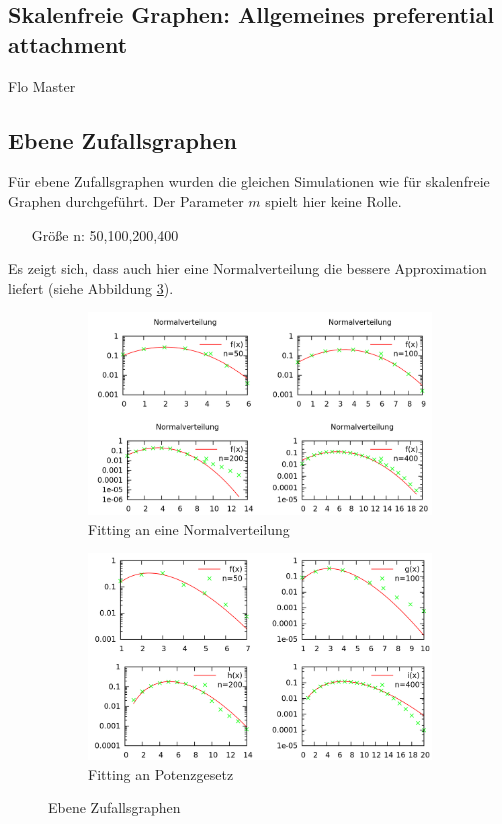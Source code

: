\documentclass[10pt]{article}
\begin{document}
\subsection{Skalenfreie Graphen: Allgemeines preferential attachment}
Flo Master

\subsection{Ebene Zufallsgraphen}
Für ebene Zufallsgraphen wurden die gleichen Simulationen wie für skalenfreie Graphen durchgeführt. Der Parameter $m$ spielt hier keine Rolle.
\begin{itemize}
\item[\quad Größe n:] 50,100,200,400
\end{itemize}
Es zeigt sich, dass auch hier eine Normalverteilung die bessere Approximation liefert (siehe Abbildung \ref{fig:planar}).

\begin{figure}[htb!]
\begin{subfigure}{.5\textwidth}
  \centering
  \includegraphics[width=\linewidth]{../Results/Normal_Planar_logscale.png}
  \caption{Fitting an eine Normalverteilung}
  \label{fig:sfig1}
\end{subfigure}%
\begin{subfigure}{.5\textwidth}
  \centering
  \includegraphics[width=\linewidth]{../Results/Power_Planar_logscale.png}
  \caption{Fitting an Potenzgesetz}
  \label{fig:sfig2}
\end{subfigure}
\caption{Ebene Zufallsgraphen}
\label{fig:planar}
\end{figure}
\end{document}

